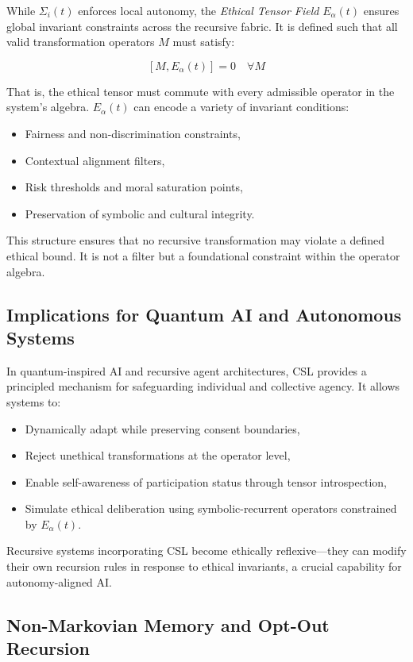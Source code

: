 \documentclass{article}
\theoremstyle{plain}
\begin{document}
While \( \Sigma_i(t) \) enforces local autonomy, the \textit{Ethical Tensor Field} \( E_\alpha(t) \) ensures global invariant constraints across the recursive fabric. It is defined such that all valid transformation operators \( M \) must satisfy:

\[
[M, E_\alpha(t)] = 0 \quad \forall M
\]

That is, the ethical tensor must commute with every admissible operator in the system’s algebra. \( E_\alpha(t) \) can encode a variety of invariant conditions:
\begin{itemize}
    \item Fairness and non-discrimination constraints,
    \item Contextual alignment filters,
    \item Risk thresholds and moral saturation points,
    \item Preservation of symbolic and cultural integrity.
\end{itemize}

This structure ensures that no recursive transformation may violate a defined ethical bound. It is not a filter but a foundational constraint within the operator algebra.

\subsection{Implications for Quantum AI and Autonomous Systems}

In quantum-inspired AI and recursive agent architectures, CSL provides a principled mechanism for safeguarding individual and collective agency. It allows systems to:
\begin{itemize}
    \item Dynamically adapt while preserving consent boundaries,
    \item Reject unethical transformations at the operator level,
    \item Enable self-awareness of participation status through tensor introspection,
    \item Simulate ethical deliberation using symbolic-recurrent operators constrained by \( E_\alpha(t) \).
\end{itemize}

Recursive systems incorporating CSL become ethically reflexive—they can modify their own recursion rules in response to ethical invariants, a crucial capability for autonomy-aligned AI.

\subsection{Non-Markovian Memory and Opt-Out Recursion}
\end{document}
